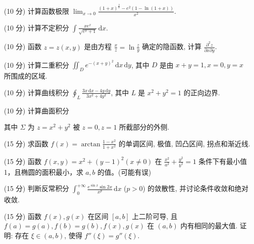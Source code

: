 (10 分) 计算函数极限 $\lim_{x\to 0}\frac{(1 + x)^{\frac{2}{x}} - e^2(1 - \ln(1 + x))}{x^2}.$\par
(10 分) 计算不定积分 $\int \frac{xe^x}{\sqrt{e^x + 1}} \, \mathrm{d}x$.\par
(10 分) 函数 $z = z(x, y)$ 是由方程 $\frac{x}{z} = \ln \frac{z}{y}$ 确定的隐函数, 计算 $\frac{\partial^2 z}{\partial x \partial y}$.\par
(10 分) 计算二重积分 $\iint_{D} e^{-(x + y)^2} \, \mathrm{d}x \, \mathrm{d}y$, 其中 $D$ 是由 $x + y = 1, x = 0, y = x$ 所围成的区域.\par
(10 分) 计算曲线积分 $\oint_{L} \frac{3x \, \mathrm{d}x - 4y \, \mathrm{d}y}{3x^{2} + 4y^{2}}$, 其中 $L$ 是 $x^{2} + y^{2} = 1$ 的正向边界.\par
\par{}
(10 分) 计算曲面积分\par
\nopagebreak[4]
其中 $\Sigma$ 为 $z = x^{2} + y^{2}$ 被 $z = 0, z = 1$ 所截部分的外侧.\par
(15 分) 求函数 $f(x) = \arctan \frac{1 - x^2}{1 + x^2}$ 的单调区间, 极值, 凹凸区间, 拐点和渐近线.\par
(15 分) 函数 $f(x, y) = x^2 + (y - 1)^2 (x \neq 0)$ 在 $\frac{x^2}{a^2} + \frac{y^2}{b^2} = 1$ 条件下有最小值 1，且椭圆的面积最小，求 $a, b$ 的值。(可能有误)\par
(15 分) 判断反常积分 $\int_{0}^{+\infty} \frac{e^{\sin x} \sin 2x}{x^p} \, \mathrm{d}x$ ($p > 0$) 的敛散性, 并讨论条件收敛和绝对收敛.\par
(15 分) 函数 $f(x), g(x)$ 在区间 $[a, b]$ 上二阶可导, 且 $f(a) = g(a), f(b) = g(b), f(x), g(x)$ 在 $(a, b)$ 内有相同的最大值. 证明: 存在 $\xi \in (a, b)$, 使得 $f''(\xi) = g''(\xi)$.\par
